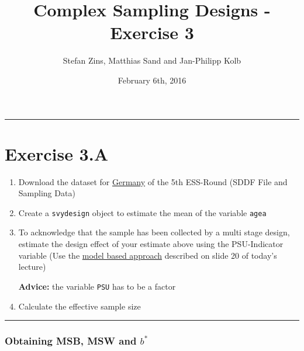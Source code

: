 \documentclass[]{article}
\title{Complex Sampling Designs - Exercise 3}
\author{Stefan Zins, Matthias Sand and Jan-Philipp Kolb}
\date{February 6th, 2016}
\begin{document}
\maketitle


\begin{center}\rule{0.5\linewidth}{\linethickness}\end{center}

\section{Exercise 3.A}\label{exercise-3.a}

\begin{enumerate}
\def\labelenumi{\arabic{enumi}.}
\item
  Download the dataset for
  \href{http://www.europeansocialsurvey.org/data/country.html?c=germany}{Germany}
  of the 5th ESS-Round (SDDF File and Sampling Data)
\item
  Create a \texttt{svydesign} object to estimate the mean of the
  variable \texttt{agea}
\item
  To acknowledge that the sample has been collected by a multi stage
  design, estimate the design effect of your estimate above using the
  PSU-Indicator variable (Use the
  \href{https://github.com/BernStZi/SamplingAndEstimation/blob/short/lecture/part_2.pdf}{model
  based approach} described on slide 20 of today's lecture)

  \textbf{Advice:} the variable \texttt{PSU} has to be a factor\\
\item
  Calculate the effective sample size
\end{enumerate}

\begin{center}\rule{0.5\linewidth}{\linethickness}\end{center}

\subsubsection{Obtaining MSB, MSW and
\(b^{*}\)}\label{obtaining-msb-msw-and-b}
\end{document}
